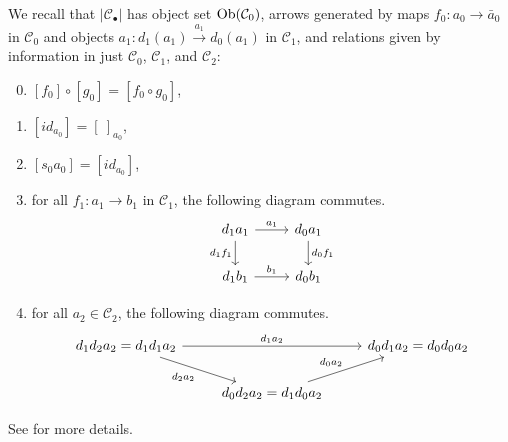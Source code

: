 \documentclass[a4paper,10pt
,draft
]{article}%
\renewcommand{\1}{\eta}%
\begin{document}
\begin{remark}
      \label{REAL_CAT_REM}
      We recall that $|\mathcal C_\bullet|$ has object set $\operatorname{Ob}(\mathcal C_0)$,
      arrows generated by
      maps $f_0: a_0 \to \bar a_0$ in $\mathcal C_0$ and objects $a_1: d_1(a_1) \xrightarrow{a_1} d_0(a_1)$ in $\mathcal C_1$,
      and relations given by information in just $\mathcal C_0$, $\mathcal C_1$, and $\mathcal C_2$:
      \begin{enumerate}[label = (\roman*)]\setcounter{enumi}{-1}
      \item $[f_0] \circ [g_0] = [f_0 \circ g_0]$,
      \item $[id_{a_0}] = [\ ]_{a_0}$,
      \item $[s_0a_0] = [id_{a_0}]$,
      \item for all $f_1: a_1 \to b_1$ in $\mathcal C_1$, the following diagram commutes.
            \begin{equation}
                  \begin{tikzcd}
                        d_1 a_1 \arrow[r, "a_1"] \arrow[d, "d_1 f_1"']
                        &
                        d_0 a_1 \arrow[d, "d_0 f_1"]
                        \\
                        d_1 b_1 \arrow[r, "b_1"]
                        &
                        d_0 b_1
                  \end{tikzcd}
            \end{equation}
      \item for all $a_2 \in \mathcal C_2$, the following diagram commutes.
            \begin{equation}
                  \begin{tikzcd}
                        d_1 d_2 a_2 = d_1 d_1 a_2 \arrow[dr, "d_2 a_2"'] \arrow[rr, "d_1 a_2"]
                        &&
                        d_0 d_1 a_2 = d_0 d_0 a_2
                        \\
                        &
                        d_0 d_2 a_2 = d_1 d_0 a_2 \arrow[ur, "d_0 a_2"]
                  \end{tikzcd}
            \end{equation}
      \end{enumerate}

      See \cite[Remark A.5]{BP_geo} for more details.
\end{remark}
\end{document}
